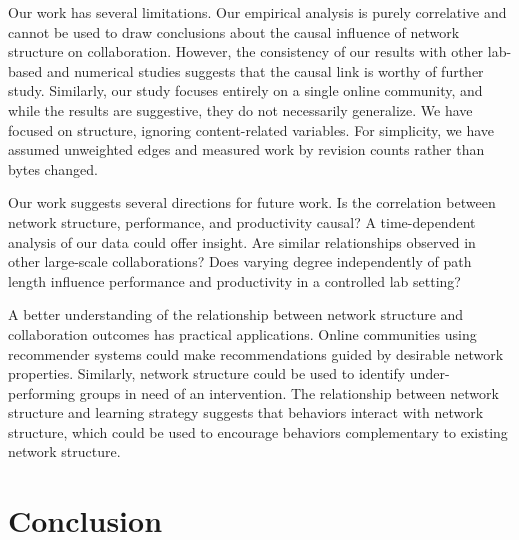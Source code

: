 Our work has several limitations.
Our empirical analysis is purely correlative and cannot be used to draw
conclusions about the causal influence of network structure on collaboration.
However, the consistency of our results with other lab-based and numerical studies
suggests that the causal link is worthy of further study.
Similarly, our study focuses entirely on a single online community,
and while the results are suggestive, they do not necessarily generalize.
We have focused on structure, ignoring content-related variables.
For simplicity, we have assumed unweighted edges and
measured work by revision counts rather than bytes changed.

Our work suggests several directions for future work.
Is the correlation between network structure, performance, and productivity causal?
A time-dependent analysis of our data could offer insight.
Are similar relationships observed in other large-scale collaborations?
Does varying degree independently of path length influence
performance and productivity in a controlled lab setting?

A better understanding of the relationship between network structure and collaboration
outcomes has practical applications.
Online communities using recommender systems could make recommendations guided by desirable network properties.
Similarly, network structure could be used to identify under-performing
groups in need of an intervention.
The relationship between network structure and learning strategy suggests that
behaviors interact with network structure,
which could be used to encourage behaviors complementary to existing network
structure.

\section{Conclusion}
\label{sec:conclusion}

